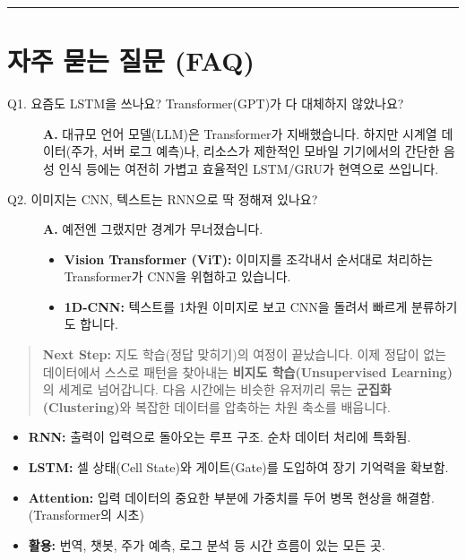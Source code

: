\documentclass[11pt,a4paper]{book}
\theoremstyle{definition}
\begin{document}
\vspace{0.5cm}\hrule\vspace{0.5cm}

\section{자주 묻는 질문 (FAQ)}

\begin{description}
    \item[Q1. 요즘도 LSTM을 쓰나요? Transformer(GPT)가 다 대체하지 않았나요?]
    \textbf{A.} 대규모 언어 모델(LLM)은 Transformer가 지배했습니다. 하지만 시계열 데이터(주가, 서버 로그 예측)나, 리소스가 제한적인 모바일 기기에서의 간단한 음성 인식 등에는 여전히 가볍고 효율적인 LSTM/GRU가 현역으로 쓰입니다.
    
    \item[Q2. 이미지는 CNN, 텍스트는 RNN으로 딱 정해져 있나요?]
    \textbf{A.} 예전엔 그랬지만 경계가 무너졌습니다.
    \begin{itemize}
        \item \textbf{Vision Transformer (ViT):} 이미지를 조각내서 순서대로 처리하는 Transformer가 CNN을 위협하고 있습니다.
        \item \textbf{1D-CNN:} 텍스트를 1차원 이미지로 보고 CNN을 돌려서 빠르게 분류하기도 합니다.
    \end{itemize}
\end{description}

\vspace{1cm}
\begin{quote}
\textbf{Next Step:} 지도 학습(정답 맞히기)의 여정이 끝났습니다. 이제 정답이 없는 데이터에서 스스로 패턴을 찾아내는 \textbf{비지도 학습(Unsupervised Learning)}의 세계로 넘어갑니다. 다음 시간에는 비슷한 유저끼리 묶는 \textbf{군집화(Clustering)}와 복잡한 데이터를 압축하는 차원 축소를 배웁니다.
\end{quote}

\begin{summarybox}[title={Unit 5 핵심 요약}]
\begin{itemize}
    \item \textbf{RNN:} 출력이 입력으로 돌아오는 루프 구조. 순차 데이터 처리에 특화됨.
    \item \textbf{LSTM:} 셀 상태(Cell State)와 게이트(Gate)를 도입하여 장기 기억력을 확보함.
    \item \textbf{Attention:} 입력 데이터의 중요한 부분에 가중치를 두어 병목 현상을 해결함. (Transformer의 시초)
    \item \textbf{활용:} 번역, 챗봇, 주가 예측, 로그 분석 등 시간 흐름이 있는 모든 곳.
\end{itemize}
\end{summarybox}
\end{document}

